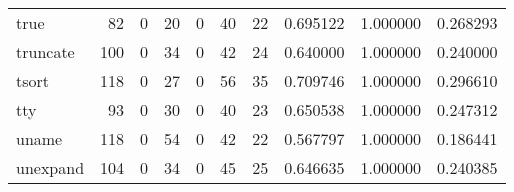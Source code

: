 \begin{longtable}{lrrrrrrrrr}
true      &                                                 82 &                                                  0 &                                                 20 &                                                  0 &                                                 40 &                                                 22 &                                           0.695122 &                               1.000000 &                             0.268293 \\
truncate  &                                                100 &                                                  0 &                                                 34 &                                                  0 &                                                 42 &                                                 24 &                                           0.640000 &                               1.000000 &                             0.240000 \\
tsort     &                                                118 &                                                  0 &                                                 27 &                                                  0 &                                                 56 &                                                 35 &                                           0.709746 &                               1.000000 &                             0.296610 \\
tty       &                                                 93 &                                                  0 &                                                 30 &                                                  0 &                                                 40 &                                                 23 &                                           0.650538 &                               1.000000 &                             0.247312 \\
uname     &                                                118 &                                                  0 &                                                 54 &                                                  0 &                                                 42 &                                                 22 &                                           0.567797 &                               1.000000 &                             0.186441 \\
unexpand  &                                                104 &                                                  0 &                                                 34 &                                                  0 &                                                 45 &                                                 25 &                                           0.646635 &                               1.000000 &                             0.240385 \\

\end{longtable}
